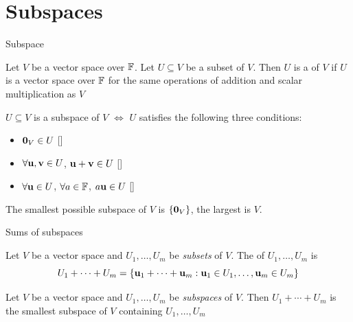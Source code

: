 \documentclass[aspectratio=169]{beamer}
\begin{document}
\section{Subspaces}

\begin{frame}{Subspace}
\begin{definition}[Subspace]
\label{def:subspace}
Let $V$ be a vector space over $\mathbb{F}$. Let $U\subseteq V$ be a subset of $V$. Then $U$ is a  of $V$ if $U$ is a vector space over $\mathbb{F}$ for the same operations of addition and scalar multiplication as $V$
\end{definition}
\begin{importanttheorem}
\label{th:conditions_subspace}
$U\subseteq V$ is a subspace of $V$ $\iff$ $U$ satisfies the following three conditions:
\begin{itemize}
    \item $\b0_V\in U$ \hfill[]
    \item $\forall \mathbf{u},\mathbf{v}\in U$, $\mathbf{u}+\mathbf{v}\in U$ 
    \hfill[]
    \item $\forall \mathbf{u}\in U$, $\forall a\in\mathbb{F}$, $a\mathbf{u}\in U$
    \hfill[]
\end{itemize}
\end{importanttheorem}
The smallest possible subspace of $V$ is $\{\b0_V\}$, the largest is $V$.
\end{frame}



\begin{frame}{Sums of subspaces}
\begin{definition}
Let $V$ be a vector space and $U_1,\ldots,U_m$ be \emph{subsets} of $V$. The  of $U_1,\ldots,U_m$ is
\[
U_1+\cdots+U_m=
\left\{
\mathbf{u}_1+\cdots+\mathbf{u}_m: \mathbf{u}_1\in U_1,\ldots,\mathbf{u}_m\in U_m
\right\}
\]
\end{definition}
\vfill
\begin{theorem}
Let $V$ be a vector space and $U_1,\ldots,U_m$ be \emph{subspaces} of $V$. Then $U_1+\cdots+U_m$ is the smallest subspace of $V$ containing $U_1,\ldots,U_m$
\end{theorem}
\end{frame}
\end{document}
